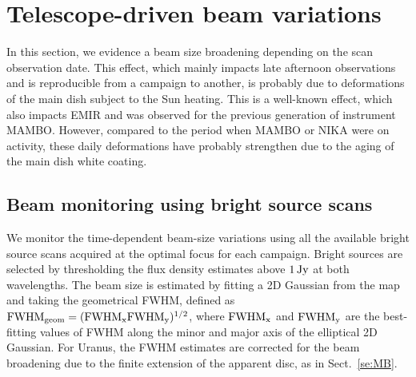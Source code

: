 
\section{Telescope-driven beam variations}%
\label{se:obsdate_variations}

In this section, we evidence a beam size broadening depending on the
scan observation date. This effect, which mainly impacts late
afternoon observations and is reproducible from a campaign to another,
is probably due to deformations of the main dish subject to the Sun
heating. This is a well-known effect, which also impacts EMIR and was
observed for the previous generation of instrument MAMBO. However,
compared to the period when MAMBO or NIKA were on activity, these
daily deformations have probably strengthen due to the aging of the
main dish white coating.

\subsection{Beam monitoring using bright source scans}
\label{se:beam_monitoring_otf}

We monitor the time-dependent beam-size variations using all the
available bright source scans acquired at the optimal focus for each
campaign. Bright sources are selected by thresholding the flux density
estimates above $1\,\rm{Jy}$ at both wavelengths.
The beam size is estimated by fitting a 2D Gaussian from the map and
taking the geometrical FWHM, defined as 
$\rm{FWHM}_{\rm{geom}} = (\rm{FWHM}_x \rm{FWHM}_y)^{1/2}$, where
$\rm{FWHM}_x$ and $\rm{FWHM}_y$ are the best-fitting values of FWHM
along the minor and major axis of the elliptical 2D Gaussian.
For Uranus, the FWHM estimates are corrected for the beam broadening due
to the finite extension of the apparent disc, as in Sect.~\ref{se:MB}. 

